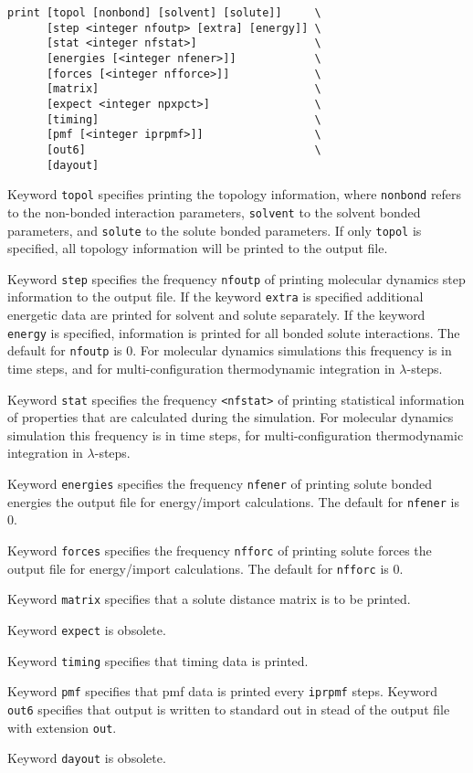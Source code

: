 \begin{description}

\item
\begin{verbatim}
print [topol [nonbond] [solvent] [solute]]     \
      [step <integer nfoutp> [extra] [energy]] \
      [stat <integer nfstat>]                  \
      [energies [<integer nfener>]]            \
      [forces [<integer nfforce>]]             \
      [matrix]                                 \
      [expect <integer npxpct>]                \
      [timing]                                 \
      [pmf [<integer iprpmf>]]                 \
      [out6]                                   \
      [dayout]
\end{verbatim}

Keyword \verb+topol+ specifies printing the topology information,
where {\tt nonbond} refers to the non-bonded interaction parameters,
{\tt solvent} to the solvent bonded parameters, and {\tt solute} to the
solute bonded parameters. If only {\tt topol} is specified, all
topology information will be printed to the output file.

Keyword \verb+step+ 
specifies the frequency \verb+nfoutp+ of printing molecular dynamics step
information to the output file. If the keyword {\tt extra} is specified
additional energetic data are printed for solvent and solute separately.
If the keyword {\tt energy} is specified, information is printed for
all bonded solute interactions.
The default for \verb+nfoutp+ is 0. For molecular dynamics simulations
this frequency is in time steps, and for multi-configuration thermodynamic
integration in $\lambda$-steps.

Keyword \verb+stat+
specifies the frequency \verb+<nfstat>+ of printing statistical information
of properties that are calculated during the simulation. 
For molecular dynamics simulation
this frequency is in time steps, for multi-configuration thermodynamic
integration in $\lambda$-steps.

Keyword \verb+energies+
specifies the frequency \verb+nfener+ of printing solute bonded energies
the output file for energy/import calculations. 
The default for \verb+nfener+ is 0. 

Keyword \verb+forces+
specifies the frequency \verb+nfforc+ of printing solute forces
the output file for energy/import calculations. 
The default for \verb+nfforc+ is 0. 

Keyword \verb+matrix+ specifies that a solute distance matrix is to
be printed.

Keyword \verb+expect+ is obsolete.

Keyword \verb+timing+ specifies that timing data is printed.

Keyword \verb+pmf+ specifies that pmf data is printed every \verb+iprpmf+ 
steps.
Keyword \verb+out6+ specifies that output is written to standard out in stead
of the output file with extension \verb+out+.

Keyword \verb+dayout+ is obsolete.


\end{description}

